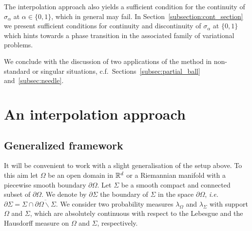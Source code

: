 \documentclass[a4paper]{article}
\theoremstyle{definition}
\numberwithin{equation}{section}
\begin{document}
The interpolation approach also yields a sufficient condition for the continuity of $\sigma_\alpha$ at $\alpha\in \{0,1\}$, which in general may fail. In Section~\ref{subsection:cont_section} we present sufficient conditions for continuity and discontinuity of $\sigma_\alpha$ at $\{0,1\}$ which hints towards a phase transition in the associated family of variational problems. 

We conclude
with the  discussion of two applications of the method in non-standard or singular situations, c.f.\ Sections~\ref{subsec:partial_ball} and~\ref{subsec:needle}. 


\section{An interpolation approach}
\label{sec:interp_method}

 \subsection{Generalized framework}
 \label{subsec:general_approach}

It will be convenient to work with a slight generalisation of the setup above. To this aim let $\Omega$ be an  open domain   in $\mathbb{R}^d$ or a Riemannian manifold with a piecewise smooth boundary  $\partial \Omega$. 
Let $\Sigma$ be a smooth compact and connected subset of $\partial \Omega$. We denote by $\partial \Sigma$ the boundary of $\Sigma$ in the space $\partial \Omega$, \textit{i.e.} $\partial \Sigma=\Sigma \cap \overline{\partial \Omega \backslash \Sigma}$. 
We consider  two probability measures $\lambda_\Omega$ and $\lambda_\Sigma$ with support $\Omega$ and $\Sigma$, which are absolutely continuous with respect to the Lebesgue and  the Hausdorff measure on $\Omega$ and  $\Sigma$, respectively. 
\end{document}
